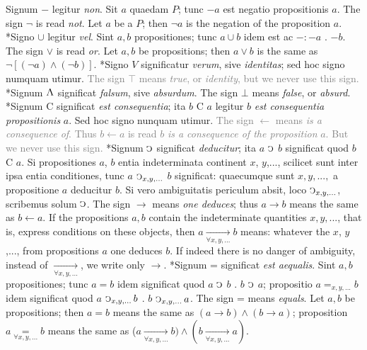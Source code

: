 \documentclass{book}
\newcommand{\C}{\mathop{\sbox0{$\displaystyle$$\reflectbox{C}$} %
\raisebox{-\height+\ht0-0.05cm}[\ht0][\dp0]{\scalebox{0.8}[0.8]{\copy0}}}\displaylimits} %
\newcommand{\abs}{\mathop{\rotatebox[origin=c]{180}{V}}}
\newcommand\irrelavent[1]{\textcolor{gray}{#1}}
\newenvironment{translateTwoCol}
               { %
                 \columnratio{0.5, 0.5} \begin{paracol}{2}
                 \newcommand{\LAT}{\switchcolumn[0]*}
                 \newcommand{\ENG}{\switchcolumn[1]}
               }
               { %
                 \let\ENG\undefined
                 \let\LAT\undefined
                 \end{paracol}
               }
\begin{document}
\begin{translateTwoCol}
Signum $-$ legitur \emph{non}. Sit $a$ quaedam $P$; tunc $-a$ est negatio propositionis $a$.
\ENG The sign $\neg$ is read \emph{not}. Let $a$ be a $P$; then $\neg a$ is the negation of the proposition $a$.
\LAT Signo $\cup$ legitur \emph{vel}. Sint $a,b$ propositiones; tunc $a \cup b$ idem est ac $-:-a$ $.$ $-b$.
\ENG The sign $\vee$ is read \emph{or}. Let $a,b$ be propositions; then $a \vee b$ is the same as $\neg[(\neg a) \wedge (\neg b)]$.
\LAT \text{[}Signo $V$ significatur \emph{verum}, sive \emph{identitas}; sed hoc signo numquam utimur\text{]}.  %
\ENG \irrelavent{The sign $\top$  means \emph{true}, or \emph{identity}, but we never use this sign.}
\LAT Signum  $\abs$ significat \emph{falsum}, sive \emph{absurdum}.
\ENG The sign $\bot$ means \emph{false}, or \emph{absurd}.
\LAT \text{[}Signum C significat \emph{est consequentia}; ita $b$ C $a$ legitur $b$ \emph{est consequentia propositionis} $a$. Sed hoc signo nunquam utimur\text{]}.
\ENG \irrelavent{The sign $\leftarrow$ means \emph{is a consequence of}. Thus $b \leftarrow a$ is read $b$ \emph{is a consequence of the proposition} $a$. But we never use this sign.}
\LAT Signum $\C$ significat \emph{deducitur}; ita $a$ $\C$ $b$ significat quod $b$ C $a$. Si propositiones $a$, $b$ entia indeterminata continent $x$, $y$,..., scilicet sunt inter ipsa entia conditiones, tunc $a$ $\C_{x,y,...}$ $b$ significat: quaecumque sunt $x,y,...,$ a propositione $a$ deducitur $b$. Si vero ambiguitatis periculum absit, loco $\C_{x,y,...}$, scribemus solum $\C$.
\ENG The sign $\rightarrow$ means \emph{one deduces}; thus $a \rightarrow b$ means the same as $b \leftarrow a$. If the propositions $a,b$ contain the indeterminate quantities $x,y,...$, that is, express conditions on these objects, then $a \xrightarrow[\forall x,y,...]{} b$ means: whatever the $x$, $y$,..., from propositions $a$ one deduces $b$. If indeed there is no danger of ambiguity, instead of $\xrightarrow[\forall x,y,...]{}$, we write only $\rightarrow$.
\LAT Signum = significat \emph{est aequalis}. Sint $a,b$ propositiones; tunc $a=b$ idem significat quod $a$ $\C$ $b$ $.$ $b$ $\C$ $a$; propositio $a=_{x,y,...} b$ idem significat quod $a$ $ \C_{x,y,...} b$ $.$ $b$ $\C_{x,y,...} a$.
\ENG The sign = means \emph{equals}. Let $a,b$ be propositions; then $a=b$ means the same as $(a \rightarrow b) \wedge (b \rightarrow a)$; proposition $a\underset{\forall x,y,...}=b$ means the same as ($a \xrightarrow[\forall x,y,...]{} b) \wedge (b \xrightarrow[\forall x,y,...]{} a)$.
\end{translateTwoCol}
\end{document}
